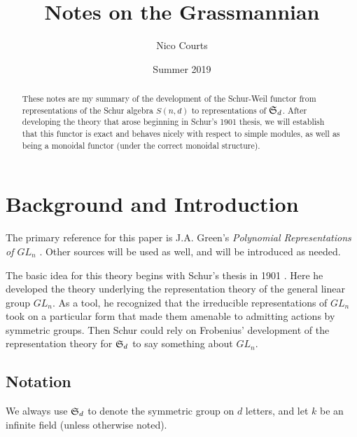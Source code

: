\documentclass[12pt]{article}
\DeclareMathOperator{\1}{\mathbbm{1}}
\begin{document}
\title{Notes on the Grassmannian \vspace{-1ex}}
\author{Nico Courts}
\date{Summer 2019}
\maketitle

\begin{abstract}
	These notes are my summary of the development of the Schur-Weil functor from representations of the Schur algebra $S(n,d)$ to 
	representations of $\mathfrak{S}_d$. After developing the theory that arose beginning in Schur's 1901 thesis, we will establish that this 
	functor is exact and behaves nicely with respect to simple modules, as well as being a monoidal functor (under the correct monoidal structure).
\end{abstract}

\section{Background and Introduction}
The primary reference for this paper is J.A. Green's \textit{Polynomial Representations of $GL_n$} \cite{green}. Other sources will be used as well, 
and will be introduced as needed.

The basic idea for this theory begins with Schur's thesis in 1901 \cite{schur-thesis}. Here he developed the theory underlying
the representation theory of the general linear group $GL_n$. As a tool, he recognized that the irreducible representations of 
$GL_n$ took on a particular form that made them amenable to admitting actions by symmetric groups. Then Schur could rely on 
Frobenius' development of the representation theory for $\mathfrak{S}_d$ to say something about $GL_n$.

\subsection{Notation}
We always use $\mathfrak{S}_d$ to denote the symmetric group on $d$ letters, and let $k$ be an infinite field (unless otherwise noted).
\end{document}
